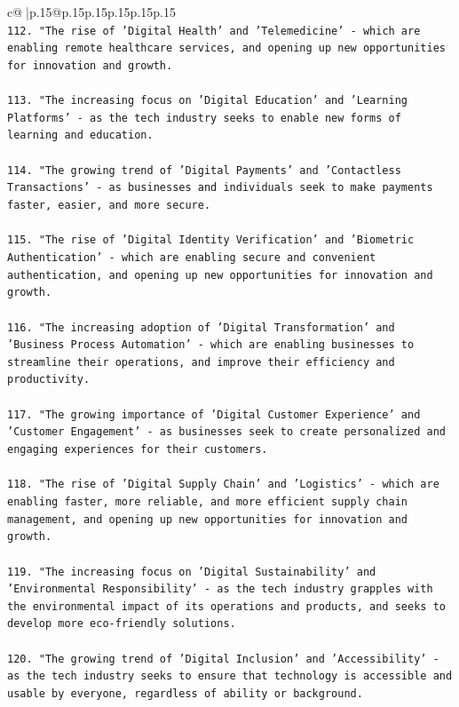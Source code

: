 \documentclass{article}
\begin{document}
{\begin{supertabular}{c@{$\;$}|p{.15\linewidth}@{}p{.15\linewidth}p{.15\linewidth}p{.15\linewidth}p{.15\linewidth}p{.15\linewidth}}
{{{\\ 
\texttt{112. "The rise of 'Digital Health' and 'Telemedicine' {-} which are enabling remote healthcare services, and opening up new opportunities for innovation and growth.} \\
\\ 
\texttt{113. "The increasing focus on 'Digital Education' and 'Learning Platforms' {-} as the tech industry seeks to enable new forms of learning and education.} \\
\\ 
\texttt{114. "The growing trend of 'Digital Payments' and 'Contactless Transactions' {-} as businesses and individuals seek to make payments faster, easier, and more secure.} \\
\\ 
\texttt{115. "The rise of 'Digital Identity Verification' and 'Biometric Authentication' {-} which are enabling secure and convenient authentication, and opening up new opportunities for innovation and growth.} \\
\\ 
\texttt{116. "The increasing adoption of 'Digital Transformation' and 'Business Process Automation' {-} which are enabling businesses to streamline their operations, and improve their efficiency and productivity.} \\
\\ 
\texttt{117. "The growing importance of 'Digital Customer Experience' and 'Customer Engagement' {-} as businesses seek to create personalized and engaging experiences for their customers.} \\
\\ 
\texttt{118. "The rise of 'Digital Supply Chain' and 'Logistics' {-} which are enabling faster, more reliable, and more efficient supply chain management, and opening up new opportunities for innovation and growth.} \\
\\ 
\texttt{119. "The increasing focus on 'Digital Sustainability' and 'Environmental Responsibility' {-} as the tech industry grapples with the environmental impact of its operations and products, and seeks to develop more eco{-}friendly solutions.} \\
\\ 
\texttt{120. "The growing trend of 'Digital Inclusion' and 'Accessibility' {-} as the tech industry seeks to ensure that technology is accessible and usable by everyone, regardless of ability or background.} \\
\\ 
}}}
\end{supertabular}}
\end{document}
